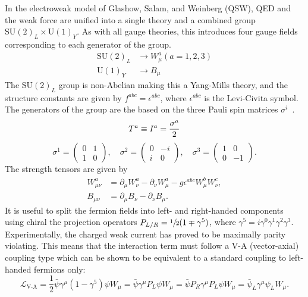 In the electroweak model of Glashow, Salam, and Weinberg (QSW), QED and the weak force are unified into a single theory and a combined group $\text{SU}(2)_L \times \text{U}(1)_Y$.
As with all gauge theories, this introduces four gauge fields corresponding to each generator of the group.
\begin{align}
	\text{SU}(2)_L & \rightarrow W_\mu^a(a = 1, 2, 3) \\
	\text{U}(1)_Y  & \rightarrow B_\mu
\end{align}
The $\text{SU}(2)_L$ group is non-Abelian making this a Yang-Mills theory, and the structure constants are given by $f^{abc} = \epsilon^{abc}$, where $\epsilon^{abc}$ is the Levi-Civita symbol.
The generators of the group are the based on the three Pauli spin matrices $\sigma^i$~\cite{paulispin}.
\begin{equation}
	\label{eq:su2_generators}
	T^a \equiv I^a = \frac{\sigma^a}{2} \\
\end{equation}
\begin{equation}
	\sigma^1 = \begin{pmatrix} 0 & 1 \\ 1 & 0 \end{pmatrix},
	\quad \sigma^2 = \begin{pmatrix} 0 & -i \\ i & 0 \end{pmatrix},
	\quad \sigma^3 = \begin{pmatrix} 1 & 0 \\ 0 & -1 \end{pmatrix}.
	\label{eq:pauli_matrices}
\end{equation}
The strength tensors are given by
\begin{align}
	\label{eq:ew_field_strength_tensors}
	W_{\mu\nu}^a & = \partial_\mu W_\nu^a - \partial_\nu W_\mu^a - g \epsilon^{abc} W_\mu^b W_\nu^c, \\
	B_{\mu\nu}   & = \partial_\mu B_\nu - \partial_\nu B_\mu.
\end{align}
It is useful to split the fermion fields into left- and right-handed components using chiral the projection operators $P_{L/R} = \sfrac{1}{2} (1 \mp \gamma^5)$, where $\gamma^5 = i \gamma^0 \gamma^1 \gamma^2 \gamma^3$.
Experimentally, the charged weak current has proved to be maximally parity violating.
This means that the interaction term must follow a V-A (vector-axial) coupling type which can be shown to be equivalent to a standard coupling to left-handed fermions only:
\begin{equation}
	\label{eq:v-a_coupling}
	\mathcal{L}_\text{V-A}
	= \frac{1}{2} \bar \psi \gamma^\mu (1 - \gamma^5) \psi W_\mu
	= \bar \psi \gamma^\mu P_L \psi W_\mu
	= \bar \psi P_R \gamma^\mu P_L \psi W_\mu
	= \bar \psi_L \gamma^\mu \psi_L W_\mu.
\end{equation}
